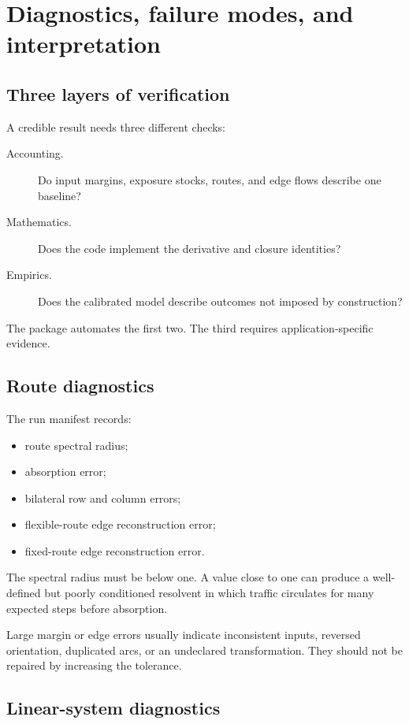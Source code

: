 \chapter{Diagnostics, failure modes, and interpretation}
\label{ch:diagnostics}

\section{Three layers of verification}

A credible result needs three different checks:
\begin{description}
  \item[Accounting.] Do input margins, exposure stocks, routes, and edge flows
  describe one baseline?
  \item[Mathematics.] Does the code implement the derivative and closure
  identities?
  \item[Empirics.] Does the calibrated model describe outcomes not imposed by
  construction?
\end{description}
The package automates the first two. The third requires application-specific
evidence.

\section{Route diagnostics}

The run manifest records:
\begin{itemize}
  \item route spectral radius;
  \item absorption error;
  \item bilateral row and column errors;
  \item flexible-route edge reconstruction error;
  \item fixed-route edge reconstruction error.
\end{itemize}
The spectral radius must be below one. A value close to one can produce a
well-defined but poorly conditioned resolvent in which traffic circulates for
many expected steps before absorption.

Large margin or edge errors usually indicate inconsistent inputs, reversed
orientation, duplicated arcs, or an undeclared transformation. They should not
be repaired by increasing the tolerance.

\section{Linear-system diagnostics}

